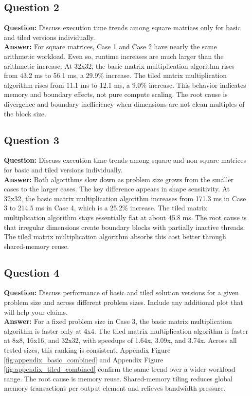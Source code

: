 \documentclass[11pt]{article}
\begin{document}
\subsection*{Question 2}
\textbf{Question:} Discuss execution time trends among square matrices only for basic and tiled versions individually.\\
\textbf{Answer:} For square matrices, 
Case 1 and Case 2 have nearly the same arithmetic workload. 
Even so, runtime increases are much
 larger than the arithmetic increase. At 32x32, 
 the basic matrix multiplication algorithm rises 
 from 43.2 ms to 56.1 ms, a 29.9\% increase.
  The tiled matrix multiplication algorithm rises from 11.1 
  ms to 12.1 ms, a 9.0\% increase.
   This behavior indicates memory and boundary effects,
    not pure compute scaling.
     The root cause is divergence and boundary 
     inefficiency when dimensions are not clean multiples
      of the block size.

\subsection*{Question 3}
\textbf{Question:} Discuss execution time trends among square and non-square matrices for basic and tiled versions individually.\\
\textbf{Answer:} Both algorithms slow down as problem size
 grows from the smaller cases to the larger cases.
  The key difference appears in shape sensitivity.
   At 32x32, the basic matrix multiplication algorithm 
   increases from 171.3 ms in Case 3 to 214.5 ms in Case 4,
    which is a 25.2\% increase. The tiled matrix 
    multiplication algorithm stays essentially 
    flat at about 45.8 ms. The root cause is
     that irregular dimensions create boundary 
     blocks with partially inactive threads.
      The tiled matrix multiplication algorithm
       absorbs this cost better through shared-memory reuse.

\subsection*{Question 4}
\textbf{Question:} Discuss performance of basic and tiled solution versions for a given problem size and across different problem sizes. Include any additional plot that will help your claims.\\
\textbf{Answer:} For a fixed problem size in Case 3, the basic matrix multiplication algorithm is faster only at 4x4. The tiled matrix multiplication algorithm is faster at 8x8, 16x16, and 32x32, with speedups of 1.64x, 3.09x, and 3.74x. Across all tested sizes, this ranking is consistent. Appendix Figure \ref{fig:appendix_basic_combined} and Appendix Figure \ref{fig:appendix_tiled_combined} confirm the same trend over a wider workload range. The root cause is memory reuse. Shared-memory tiling reduces global memory transactions per output element and relieves bandwidth pressure.
\end{document}
